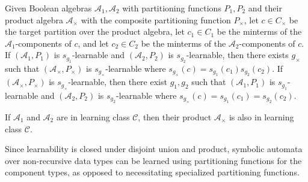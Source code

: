 \begin{theorem}\label{thm:prod}
    Given Boolean algebras $\mathcal{A}_1, \mathcal{A}_2$
    with partitioning functions $P_1, P_2$
    and their product algebra $\mathcal{A}_\times$
    with the composite partitioning function $P_\times$,
    let $c \in C_\times$ be the target partition over the product algebra,
    let $c_1 \in C_1$ be the minterms of the $\mathcal{A}_1$-components of $c$, and
    let $c_2 \in C_2$ be the minterms of the $\mathcal{A}_2$-components of $c$.
    \rone If $(\mathcal{A}_1, P_1)$ is $s_{g_1}$-learnable
    and $(\mathcal{A}_2, P_2)$ is $s_{g_2}$-learnable,
    then there exists $g_\times$ such that
    $(\mathcal{A}_\times, P_\times)$ is $s_{g_\times}$-learnable
    where $s_{g_\times}(c) = s_{g_1}(c_1) s_{g_2}(c_2)$.
    \rtwo If $(\mathcal{A}_\times, P_\times)$ is $s_{g_\times}$-learnable,
    then there exist $g_1, g_2$ such that
    $(\mathcal{A}_1, P_1)$ is $s_{g_1}$-learnable
    and $(\mathcal{A}_2, P_2)$ is $s_{g_2}$-learnable
    where $s_{g_\times}(c) = s_{g_1}(c_1) = s_{g_2}(c_2)$.
\end{theorem}

\begin{corollary}\label{thm:prodcor}
    If $\mathcal{A}_1$
    and $\mathcal{A}_2$ are in learning class $\mathcal{C}$,
    then their product $\mathcal{A}_\times$ is also in learning class
    $\mathcal{C}$.
\end{corollary}
Since learnability is closed
under disjoint union and product,
symbolic automata over non-recursive data types can 
be learned using partitioning functions for the component types,
as opposed to necessitating specialized partitioning functions.

